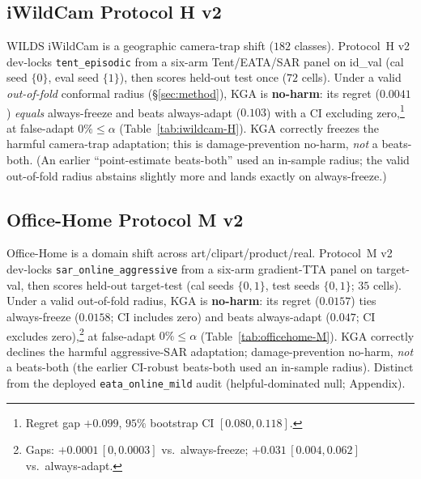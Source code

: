 \documentclass[conference]{IEEEtran}
\theoremstyle{plain}
\theoremstyle{definition}
\theoremstyle{remark}
\begin{document}
\subsection{iWildCam Protocol H v2}
WILDS iWildCam is a geographic camera-trap shift ($182$ classes). Protocol~H v2 dev-locks
\texttt{tent\_episodic} from a six-arm Tent/EATA/SAR panel on id\_val (cal seed $\{0\}$,
eval seed $\{1\}$), then scores held-out test once ($72$ cells). Under a valid \emph{out-of-fold}
conformal radius (\S\ref{sec:method}), \textsc{KGA} is \textbf{no-harm}: its regret ($0.0041$)
\emph{equals} always-freeze and beats always-adapt ($0.103$) with a CI excluding
zero,\footnote{Regret gap $+0.099$, $95\%$ bootstrap CI $[0.080,0.118]$.} at false-adapt
$0\%\le\alpha$ (Table~\ref{tab:iwildcam-H}). \textsc{KGA} correctly
freezes the harmful camera-trap adaptation; this is damage-prevention no-harm, \emph{not} a
beats-both. (An earlier ``point-estimate beats-both'' used an in-sample radius; the valid out-of-fold
radius abstains slightly more and lands exactly on always-freeze.)

\subsection{Office-Home Protocol M v2}
Office-Home is a domain shift across art/clipart/product/real. Protocol~M v2 dev-locks
\texttt{sar\_online\_aggressive} from a six-arm gradient-TTA panel on target-val, then scores
held-out target-test (cal seeds $\{0,1\}$, test seeds $\{0,1\}$; $35$ cells). Under a valid
out-of-fold radius, \textsc{KGA} is \textbf{no-harm}: its regret ($0.0157$) ties always-freeze
($0.0158$; CI includes zero) and beats always-adapt ($0.047$; CI excludes
zero),\footnote{Gaps: $+0.0001\,[0,0.0003]$ vs.\ always-freeze; $+0.031\,[0.004,0.062]$ vs.\
always-adapt.} at false-adapt $0\%\le\alpha$
(Table~\ref{tab:officehome-M}). \textsc{KGA} correctly declines the harmful aggressive-SAR
adaptation; damage-prevention no-harm, \emph{not} a beats-both (the earlier CI-robust beats-both used
an in-sample radius). Distinct from the deployed \texttt{eata\_online\_mild} audit
(helpful-dominated null; Appendix).

\begin{table}[t]\centering\small
\caption{iWildCam Protocol~H v2: dev-locked \texttt{tent\_episodic}, held-out test ($n{=}72$).}
\label{tab:iwildcam-H}
\end{table}
\end{document}
